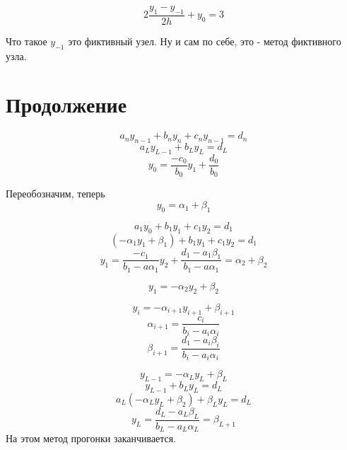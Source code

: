 \documentclass[a4paper,12pt]{article}
\newcommand\attention[1]{\colorbox{cyan!30}{#1}}
\begin{document}
\[2 \frac{y_1 - y_{-1}}{2h} + y_0 = 3\]

Что такое $y_{-1}$ это \attention{фиктивный узел}. Ну и сам по себе, это - метод фиктивного узла.

\section*{Продолжение}

\[a_n y_{n-1} + b_n y_n + c_n y_{n-1} = d_n\]
\[a_L y_{L-1} + b_L y_L = d_L\]
\[y_0 = \frac{-c_0}{b_0}y_1 + \frac{d_0}{b_0}\]

Переобозначим, теперь\\
\[y_0 = \alpha_1 + \beta_1\]

\[a_1 y_0 + b_1 y_1 + c_1 y_2 = d_1\]
\[(-\alpha_1 y_1 + \beta_1) + b_1 y_1 + c_1 y_2 = d_1\]
\[y_1 = \frac{-c_1}{b_1 - a \alpha_1} y_2 + \frac{d_1 - a_1 \beta_1}{b_1 - a \alpha_1} = \alpha_2 + \beta_2\]

\[y_1 = -\alpha_2 y_2 + \beta_2\]

\[y_i = -\alpha_{i+1} y_{i+1} + \beta_{i+1}\]
\[\alpha_{i+1} = \frac{c_i}{b_i - a_i \alpha_i}\]
\[\beta_{i+1} = \frac{d_1 - a_i \beta_i}{b_i - a_i \alpha_i}\]

\[y_{L-1} = -\alpha_L y_L + \beta_L\]
\[y_{L-1} + b_L y_L = d_L\]
\[a_L (-\alpha_L y_L + \beta_2) + \beta_L y_L = d_L\]
\[y_L = \frac{d_L - a_L \beta_L}{b_L - a_L \alpha_L} = \beta_{L+1}\]
На этом метод прогонки заканчивается.
\end{document}
